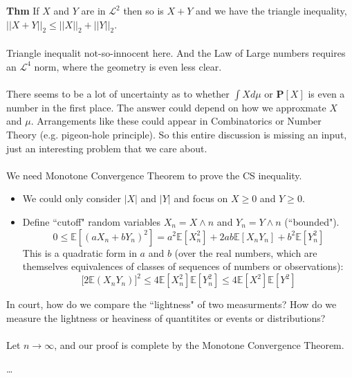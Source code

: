 \documentclass[12pt]{article}
\begin{document}
{\color{red!50!orange!50!black}\textbf{Thm}} If $X$ and $Y$ are in $\mathcal{L}^2$ then so is $X+Y$ and we have the triangle inequality, $||X+Y||_2 \leq ||X||_2 + ||Y||_2$. \\ \\
Triangle inequalit not-so-innocent here.  And the Law of Large numbers requires an $\mathcal{L}^4$ norm, where the geometry is even less clear. \\ \\
There seems to be a lot of uncertainty as to whether $\int X d\mu$ or $\textbf{P}[X]$ is even a number in the first place.  The answer could depend on how we approxmate $X$ and $\mu$.  Arrangements like these could appear in Combinatorics or Number Theory (e.g. pigeon-hole principle).  So this entire discussion is missing an input, just an interesting problem that we care about. \\ \\
We need Monotone Convergence Theorem to prove the CS inequality.
\begin{itemize}
\item We could only consider $|X|$ and $|Y|$ and focus on $X \geq 0$ and $Y \geq 0$.
\item Define ``cutoff" random variables $X_n = X \wedge n$ and $Y_n = Y \wedge n$ (``bounded").
$$ 0 \leq \mathbb{E}[(aX_n + bY_n)^2] = a^2 \mathbb{E}[X_n^2] + 2ab \mathbb{E}[X_nY_n] + b^2 \mathbb{E}[Y_n^2] $$
This is a {\color{red}quadratic form} in $a$ and $b$ (over the real numbers, which are themselves equivalences of classes of sequences of numbers or observations): 
$$ \big[ 2 \mathbb{E}(X_n Y_n) \big]^2 \leq 4 \mathbb{E}[X_n^2] \mathbb{E}[Y_n^2] \leq 4 \mathbb{E}[X^2] \mathbb{E}[Y^2] $$ 
\end{itemize}
In court, how do we compare the ``lightness" of two measurments?  How do we measure the lightness or heaviness of quantitites or events or distributions? \\ \\
Let $n \to \infty$, and our proof is complete by the Monotone Convergence Theorem.

\vfill



\begin{thebibliography}{}

\item \dots 

\end{thebibliography}
\end{document}
